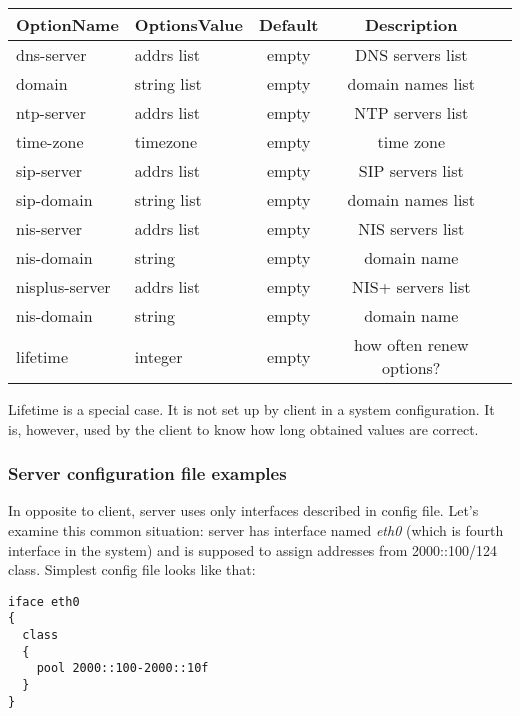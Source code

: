 \begin{center}
\begin{tabular}{|l|l|c|c|l|}
\hline
OptionName       & OptionsValue& Default    & Description \\ \hline
dns-server       & addrs list  & empty      & DNS servers list \\
domain           & string list & empty      & domain names list \\
ntp-server       & addrs list  & empty      & NTP servers list \\
time-zone        & timezone    & empty      & time zone \\
sip-server       & addrs list  & empty      & SIP servers list \\
sip-domain       & string list & empty      & domain names list \\

nis-server       & addrs list  & empty      & NIS servers list \\
nis-domain       & string      & empty      & domain name \\

nisplus-server   & addrs list  & empty      & NIS+ servers list \\
nis-domain       & string      & empty      & domain name \\
lifetime         & integer     & empty      & how often renew options? \\
\hline
\end{tabular}
\end{center}

Lifetime is a special case. It is not set up by client in a system
configuration. It is, however, used by the client to know how long
obtained values are correct.

\subsubsection{Server configuration file examples}

In opposite to client, server uses only interfaces described in config
file. Let's examine this common situation: server has interface
named \emph{eth0} (which is fourth interface in the system) and is
supposed to assign addresses from 2000::100/124 class. Simplest config
file looks like that:

\begin{verbatim}
iface eth0
{ 
  class
  {
    pool 2000::100-2000::10f
  } 
}
\end{verbatim}

